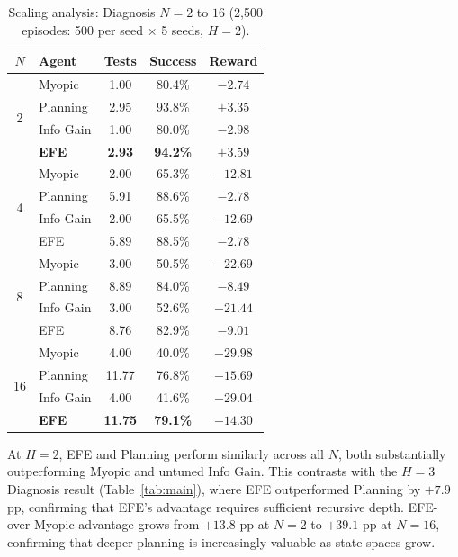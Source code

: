 \documentclass{article}
\begin{document}
\begin{table}[h]
\centering
\caption{Scaling analysis: Diagnosis $N = 2$ to $16$ (2{,}500 episodes: 500 per seed $\times$ 5 seeds, $H{=}2$).}
\begin{small}
\begin{tabular}{clccc}
\toprule
$N$ & Agent & Tests & Success & Reward \\
\midrule
\multirow{4}{*}{2}  & Myopic    & 1.00 & 80.4\% & $-2.74$ \\
                     & Planning  & 2.95 & 93.8\% & $+3.35$ \\
                     & Info Gain & 1.00 & 80.0\% & $-2.98$ \\
                     & \textbf{EFE} & \textbf{2.93} & \textbf{94.2\%} & $\mathbf{+3.59}$ \\
\midrule
\multirow{4}{*}{4}  & Myopic & 2.00 & 65.3\% & $-12.81$ \\
                     & Planning & 5.91 & 88.6\% & $-2.78$ \\
                     & Info Gain & 2.00 & 65.5\% & $-12.69$ \\
                     & EFE & 5.89 & 88.5\% & $-2.78$ \\
\midrule
\multirow{4}{*}{8}  & Myopic & 3.00 & 50.5\% & $-22.69$ \\
                     & Planning & 8.89 & 84.0\% & $-8.49$ \\
                     & Info Gain & 3.00 & 52.6\% & $-21.44$ \\
                     & EFE & 8.76 & 82.9\% & $-9.01$ \\
\midrule
\multirow{4}{*}{16} & Myopic & 4.00 & 40.0\% & $-29.98$ \\
                     & Planning & 11.77 & 76.8\% & $-15.69$ \\
                     & Info Gain & 4.00 & 41.6\% & $-29.04$ \\
                     & \textbf{EFE} & \textbf{11.75} & \textbf{79.1\%} & $\mathbf{-14.30}$ \\
\bottomrule
\end{tabular}
\end{small}
\end{table}

At $H{=}2$, EFE and Planning perform similarly across all $N$, both substantially outperforming Myopic and untuned Info Gain. This contrasts with the $H{=}3$ Diagnosis result (Table~\ref{tab:main}), where EFE outperformed Planning by $+7.9$ pp, confirming that EFE's advantage requires sufficient recursive depth. EFE-over-Myopic advantage grows from $+13.8$ pp at $N{=}2$ to $+39.1$ pp at $N{=}16$, confirming that deeper planning is increasingly valuable as state spaces grow.
\end{document}
